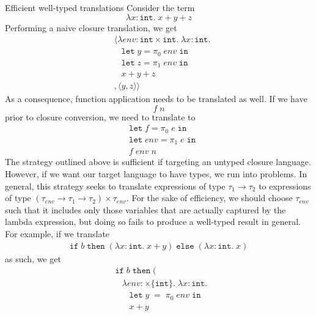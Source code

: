 \documentclass{amsart}
\newcommand{\kwd}[1]{\ensuremath{\mathtt{#1}}}
\newcommand{\intt}{\ensuremath{\mathtt{int}}}
\newcommand{\vect}[1]{\langle #1 \rangle}
\begin{document}
\begin{section}{Efficient well-typed translations}
    Consider the term
        \[
            \lambda x : \intt. \; x + y + z
        \]
    Performing a naive closure translation, we get
        \begin{align*}
            &\vect{\lambda env : \intt \times \intt. \; \lambda x : \intt. \\
            & \; \; \; \kwd{let} \; y = \pi_0 \; env \; \kwd{in} \\
            & \; \; \; \kwd{let} \; z = \pi_1 \; env \; \kwd{in} \\ 
            & \; \; \; x + y + z \\
            &, \vect{y, z}}
        \end{align*}
    As a consequence, function application needs to be translated as well. If we have
        \[
            f \; n
        \]
    prior to closure conversion, we need to translate to
        \begin{align*}
            &\kwd{let} \; f = \pi_0 \; e \; \kwd{in} \\
            &\kwd{let} \; env = \pi_1 \; e \; \kwd{in} \\
            &f \; env \; n
        \end{align*}
    The strategy outlined above is sufficient if targeting an untyped closure language. However, if we want our target language to have types, we run into problems. In general, this strategy seeks to translate expressions of type $\tau_1 \to \tau_2$ to expressions of type $(\tau_{env} \to \tau_1 \to \tau_2) \times \tau_{env}$. For the sake of efficiency, we should choose $\tau_{env}$ such that it includes only those variables that are actually captured by the lambda expression, but doing so fails to produce a well-typed result in general. For example, if we translate
        \begin{align*}
            \kwd{if} \; b \; \kwd{then} \; (\lambda x : \intt. \; x + y) \; \kwd{else} \; (\lambda x : \intt. \; x)
        \end{align*}
    as such, we get
        \begin{align*}
          &\kwd{if} \; b \; \kwd{then} \; ( \\
          & \; \; \; \lambda env : \times\{\intt\}. \; \lambda x : \intt. \; \\
          & \; \; \; \; \; \; \kwd{let} \; y \; = \; \pi_0 \; env \; \kwd{in} \\
          & \; \; \; \; \; \; x + y \\

\end{align*}
\end{section}
\end{document}
